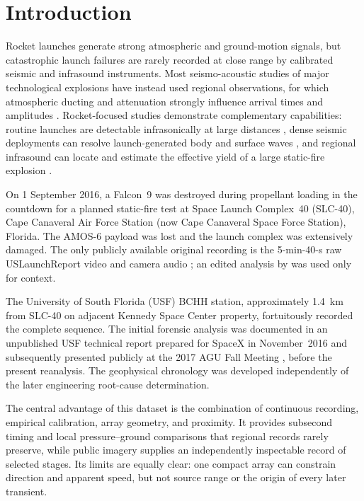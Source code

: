 \documentclass[]{seismica}
\begin{document}
\section{Introduction}
\label{sec:introduction}

Rocket launches generate strong atmospheric and ground-motion signals, but
catastrophic launch failures are rarely recorded at close range by calibrated
seismic and infrasound instruments. Most seismo-acoustic studies of major
technological explosions have instead used regional observations, for which
atmospheric ducting and attenuation strongly influence arrival times and
amplitudes \citep{ottemoller_2008,green_2008,ceranna_2009,smink_2019,
pilger_beirut_2021,kim_pasyanos_2022}. Rocket-focused studies demonstrate
complementary capabilities: routine launches are detectable infrasonically at
large distances \citep{pilger_rocket_2021}, dense seismic deployments can
resolve launch-generated body and surface waves
\citep{schuster_rocketquake_2025}, and regional infrasound can locate and
estimate the effective yield of a large static-fire explosion
\citep{silber_scamfer_newglenn_2026}.

On 1 September 2016, a Falcon~9 was destroyed during propellant loading in the
countdown for a planned static-fire test at Space Launch Complex~40 (SLC-40),
Cape Canaveral Air Force Station (now Cape Canaveral Space Force Station),
Florida. The AMOS-6 payload was lost and the launch complex was extensively
damaged. The only publicly available original recording is the 5-min-40-s raw
USLaunchReport video and camera audio \citep{uslaunchreport_amos6_video_2016};
an edited analysis by \citet{manley_spacex_explosion_2016} was used only for
context. 

The University of South Florida (USF) BCHH station, approximately 1.4~km from
SLC-40 on adjacent Kennedy Space Center property, fortuitously recorded the
complete sequence. The initial forensic analysis was documented in an
unpublished USF technical report prepared for SpaceX in November~2016
\citep{thompson_mcnutt_fireball_2016} and subsequently presented publicly at
the 2017 AGU Fall Meeting \citep{thompson_agu_falcon9_2017}, before the
present reanalysis. The geophysical chronology was developed independently of
the later engineering root-cause determination.

The central advantage of this dataset is the combination of continuous
recording, empirical calibration, array geometry, and proximity. It provides
subsecond timing and local pressure--ground comparisons that regional records
rarely preserve, while public imagery supplies an independently inspectable
record of selected stages. Its limits are equally clear: one compact array can
constrain direction and apparent speed, but not source range or the origin of
every later transient.
\end{document}
